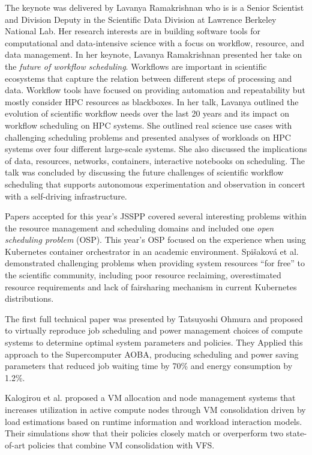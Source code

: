 \documentclass{llncs}
\begin{document}
The keynote was delivered by Lavanya Ramakrishnan who is is a Senior Scientist and Division Deputy in 
the Scientific Data Division at Lawrence Berkeley National Lab. Her research interests are in building 
software tools for computational and data-intensive science with a focus on workflow, resource, and 
data management. In her keynote, Lavanya Ramakrishnan presented her take on the \emph{future of workflow
scheduling}. Workflows are important in scientific ecosystems that capture the relation between different 
steps of processing and data. Workflow tools have focused on providing automation and repeatability but 
mostly consider HPC resources as blackboxes. In her talk, Lavanya outlined the evolution of scientific 
workflow needs over the last 20 years and its impact on workflow scheduling on HPC systems. 
She outlined real science use cases with challenging scheduling problems and presented analyses 
of workloads on HPC systems over four different large-scale systems. She also discussed the implications 
of data, resources, networks, containers, interactive notebooks on scheduling. The talk was concluded 
by discussing the future challenges of scientific workflow scheduling that supports autonomous 
experimentation and observation in concert with a self-driving infrastructure. 

Papers accepted for this year's JSSPP covered several interesting problems within the
resource management and scheduling domains and included one \emph{open scheduling problem} (OSP).
This year's OSP focused on the experience when using Kubernetes container orchestrator in an academic
environment. Spi\v{s}akov\'{a} et al. demonstrated challenging problems when providing
system resources ``for free'' to the scientific community, including poor resource reclaiming,
overestimated resource requirements and lack of fairsharing mechanism in current Kubernetes distributions.

The first full technical paper was presented by Tatsuyoshi Ohmura and proposed to virtually reproduce job
scheduling and power management choices of compute systems to determine optimal system parameters and
policies. They Applied this approach to the Supercomputer AOBA, producing scheduling 
and power saving parameters that reduced job waiting time by 70\% and energy consumption by 1.2\%.

Kalogirou et al. proposed a VM allocation and node management systems that increases utilization
in active compute nodes through VM consolidation driven by load estimations based on runtime
information and workload interaction models. Their simulations show that their policies closely match
or overperform two state-of-art policies that combine VM consolidation with VFS.
\end{document}
